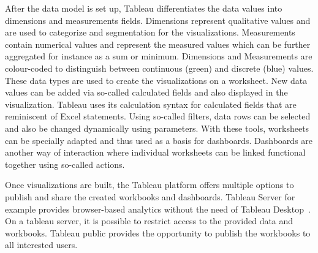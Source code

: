 \documentclass[aac,crcready]{iosart2x}
\begin{document}
After the data model is set up, Tableau differentiates the data values into dimensions and measurements fields. Dimensions represent qualitative values and are used to categorize and segmentation for the visualizations. Measurements contain numerical values and represent the measured values which can be further aggregated for instance as a sum or minimum. Dimensions and Measurements are colour-coded to distinguish between continuous (green) and discrete (blue) values. These data types are used to create the visualizations on a worksheet. New data values can be added via so-called calculated fields and also displayed in the visualization. Tableau uses its calculation syntax for calculated fields that are reminiscent of Excel statements. Using so-called filters, data rows can be selected and also be changed dynamically using parameters. With these tools, worksheets can be specially adapted and thus used as a basis for dashboards. Dashboards are another way of interaction where individual worksheets can be linked functional together using so-called actions.

Once visualizations are built, the Tableau platform offers multiple options to publish and share the created workbooks and dashboards. Tableau Server for example provides browser-based analytics without the need of Tableau Desktop~\cite{Tableau.20.03.2021}. On a tableau server, it is possible to restrict access to the provided data and workbooks. Tableau public provides the opportunity to publish the workbooks to all interested users.
\end{document}
